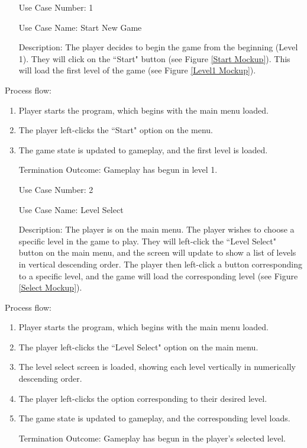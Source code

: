\documentclass[10pt,conference,onecolumn,compsoc]{IEEEtran}
\begin{document}
\begin{itemize}
\item[Use Case Number:] 1
\item[Use Case Name:] Start New Game
\item[Description:] The player decides to begin the game from the beginning (Level 1). They will click on the ``Start" button (see Figure \ref{Start Mockup}). This will load the first level of the game (see Figure \ref{Level1 Mockup}).
\end{itemize}

Process flow:

\begin{enumerate}
\item Player starts the program, which begins with the main menu loaded.
\item The player left-clicks the ``Start" option on the menu.
\item The game state is updated to gameplay, and the first level is loaded.
\item[Termination Outcome:] Gameplay has begun in level 1.
\end{enumerate}

\begin{itemize}
\item[Use Case Number:] 2
\item[Use Case Name:] Level Select
\item[Description:] The player is on the main menu. The player wishes to choose a specific level in the game to play. They will left-click the ``Level Select" button on the main menu, and the screen will update to show a list of levels in vertical descending order. The player then left-click a button corresponding to a specific level, and the game will load the corresponding level (see Figure \ref{Select Mockup}).
\end{itemize}

Process flow:

\begin{enumerate}
\item Player starts the program, which begins with the main menu loaded.
\item The player left-clicks the ``Level Select" option on the main menu.
\item The level select screen is loaded, showing each level vertically in numerically descending order.
\item The player left-clicks the option corresponding to their desired level.
\item The game state is updated to gameplay, and the corresponding level loads.
\item[Termination Outcome:] Gameplay has begun in the player's selected level.
\end{enumerate}
\end{document}
